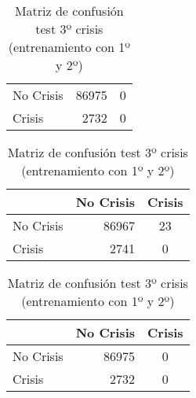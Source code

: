 \begin{table}
\begin{center}
\begin{subtable}[c]{0.4\textwidth}
\begin{tabular}{lrc}
                \hline
                No Crisis & 86975 & 0 \\
                Crisis & 2732 & 0\\
                \hline
            \end{tabular}
            \label{tab:mat-conf-stats-1.13}
        \end{subtable}
        \begin{subtable}[c]{0.4\textwidth}
            \begin{tabular}{lrc}
                \hline
                 & No Crisis & Crisis \\
                \hline
                No Crisis & 86967 & 23 \\
                Crisis & 2741 & 0\\
                \hline
            \end{tabular}
            \label{tab:mat-conf-raw-1.13}
        \end{subtable}
        \hspace{1em}\vspace{1em}
        \begin{subtable}[c]{0.4\textwidth}
                \begin{tabular}{lrc}
                \hline
                 & No Crisis & Crisis \\
                \hline
                No Crisis & 86975 & 0 \\
                Crisis & 2732 & 0\\
                \hline
            \end{tabular}
            \label{tab:mat-conf-stats-1.14}
        \end{subtable}
        \caption{Matriz de confusión test 3º crisis (entrenamiento con 1º y 2º)}
        \label{tab:matriz-test-2-3a}
    \end{center}
\end{table}
